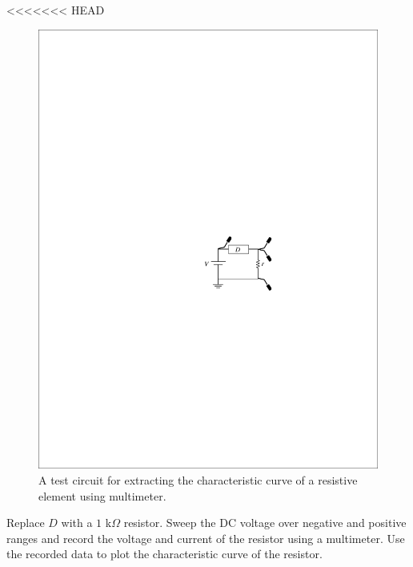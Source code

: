 \documentclass[11pt]{article}
\begin{document}
\begin{question}

<<<<<<< HEAD

\begin{figure}[H]
\centering
\includegraphics[scale=1.2,angle=0]{Fig/cir2.pdf}
\caption{A test circuit for extracting the characteristic curve of a resistive element using multimeter.} \label{fig:cir2}
\end{figure}

\begin{subquestion}{Replace $D$ with a $1$ k$\Omega$ resistor. Sweep the DC voltage over negative and positive ranges and record the voltage and current of the resistor using a multimeter. Use the recorded data to plot the characteristic curve of the resistor.} 
\answer{}
\end{subquestion}


\end{question}
\end{document}
